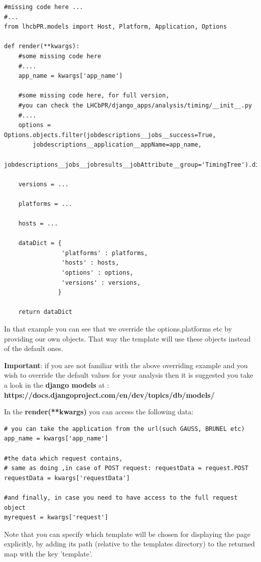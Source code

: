 \documentclass{lhcbnote}
\begin{document}
\begin{verbatim}
#missing code here ...
#...
from lhcbPR.models import Host, Platform, Application, Options

def render(**kwargs):
    #some missing code here
    #....
    app_name = kwargs['app_name']

    #some missing code here, for full version,
    #you can check the LHCbPR/django_apps/analysis/timing/__init__.py
    #....
    options = Options.objects.filter(jobdescriptions__jobs__success=True,
        jobdescriptions__application__appName=app_name,
        jobdescriptions__jobs__jobresults__jobAttribute__group='TimingTree').distinct().order_by('description')
        
    versions = ...
    
    platforms = ...
     
    hosts = ...
    
    dataDict = {
                'platforms' : platforms,
                'hosts' : hosts,
                'options' : options,
                'versions' : versions,
               }
      
    return dataDict
\end{verbatim} 

In that example you can see that we override the options,platforms etc by providing our own objects. That way
the template will use these objects instead of the default ones. 

{\bf Important}: if you are not familiar with the above overriding example and you wish to override the default values for your analysis then it is suggested you take a look in the {\bf django models} at :
 {\bf https://docs.djangoproject.com/en/dev/topics/db/models/}

\vspace{4 mm}
In the {\bf render(**kwargs)} you can access the following data:

\begin{verbatim}
# you can take the application from the url(such GAUSS, BRUNEL etc)
app_name = kwargs['app_name']

#the data which request contains,
# same as doing ,in case of POST request: requestData = request.POST
requestData = kwargs['requestData']

#and finally, in case you need to have access to the full request object
myrequest = kwargs['request']
\end{verbatim}

\vspace{4 mm}
Note that you can specify which template will be chosen for displaying the page explicitly, by adding its path (relative to the templates directory) to the returned map with the key 'template'.
\end{document}
